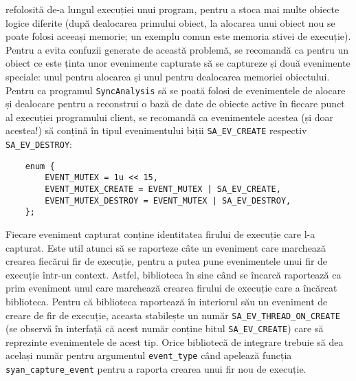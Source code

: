 refolosită de-a lungul execuției unui program, pentru a stoca mai multe
obiecte logice diferite (după dealocarea primului obiect, la alocarea
unui obiect nou se poate folosi aceeași memorie; un exemplu comun este
memoria stivei de execuție). Pentru a evita confuzii generate de această
problemă, se recomandă ca pentru un obiect ce este ținta unor evenimente
capturate să se captureze și două evenimente speciale: unul pentru
alocarea și unul pentru dealocarea memoriei obiectului. Pentru ca
programul \lstinline{SyncAnalysis} să se poată folosi de evenimentele de
alocare și dealocare pentru a reconstrui o bază de date de obiecte
active în fiecare punct al execuției programului client, se recomandă ca
evenimentele acestea (și doar acestea!) să conțină în tipul
evenimentului biții \lstinline{SA_EV_CREATE} respectiv
\lstinline{SA_EV_DESTROY}:
\begin{lstlisting}
    enum {
        EVENT_MUTEX = 1u << 15,
        EVENT_MUTEX_CREATE = EVENT_MUTEX | SA_EV_CREATE,
        EVENT_MUTEX_DESTROY = EVENT_MUTEX | SA_EV_DESTROY,
    };
\end{lstlisting}

Fiecare eveniment capturat conține identitatea firului de execuție care
l-a capturat. Este util atunci să se raporteze câte un eveniment care
marchează crearea fiecărui fir de execuție, pentru a putea pune
evenimentele unui fir de execuție într-un context. Astfel, biblioteca în
sine când se încarcă raportează ca prim eveniment unul care marchează
crearea firului de execuție care a încărcat biblioteca. Pentru că
biblioteca raportează în interiorul său un eveniment de creare de fir de
execuție, aceasta stabilește un număr
\lstinline{SA_EV_THREAD_ON_CREATE} (se observă în interfață că acest
număr conține bitul \lstinline{SA_EV_CREATE}) care să reprezinte
evenimentele de acest tip. Orice bibliotecă de integrare trebuie să dea
același număr pentru argumentul \lstinline{event_type} când apelează
funcția \lstinline{syan_capture_event} pentru a raporta crearea unui fir
nou de execuție.

